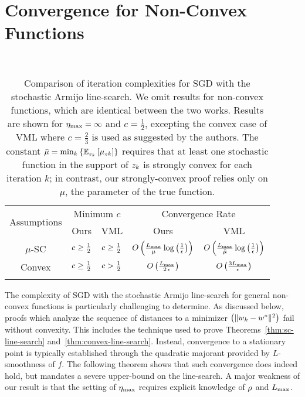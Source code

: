 \section{Convergence for Non-Convex Functions}~\label{sec:ls-nc}

\begin{table}[t]
    \centering
    \begin{tabular}{c l l c c }\toprule
        \multirow{2}{*}{Assumptions} & \multicolumn{2}{c}{Minimum \( c \)} & \multicolumn{2}{c}{Convergence Rate}\\%
        \cmidrule(lr){2-3} \cmidrule(lr){4-5}
                 & \multicolumn{1}{c}{Ours} & \multicolumn{1}{c}{VML}%
                 & \multicolumn{1}{c}{Ours} & \multicolumn{1}{c}{VML}\\ \midrule
    \( \mu \)-SC & \( c \geq \frac 1 2 \)%
                 & \( c \geq \frac 1 2 \)%
                 & \( O\left(\frac{L_{\text{max}}}{\mu} \log\left(\frac{1}{\epsilon}\right)\right) \)%
                 & \( O\left(\frac{L_{\text{max}}}{\bar \mu} \log\left(\frac{1}{\epsilon}\right)\right) \) \\ \addlinespace
    Convex       & \( c \geq \frac 1 2 \)%
                 & \( c > \frac 1 2 \)%
                 & \( O\left(\frac{L_{\text{max}}}{2 \, \epsilon}\right) \)%
                 & \( O\left(\frac{3 L_{\text{max}}}{\epsilon}\right) \)\\ \addlinespace 
        \end{tabular}
        \caption{Comparison of iteration complexities for \ac{SGD} with the stochastic Armijo line-search.  We omit results for non-convex functions, which are identical between the two works. Results are shown for \( \eta_{\text{max}} = \infty \) and \( c = \frac{1}{2} \), excepting the convex case of VML \citep{vaswani2019painless} where \( c = \frac{2}{3} \) is used as suggested by the authors. The constant \( \bar \mu = \min_k \left\{\mathbb{E}_{z_{k}} \left[\mu_{zk}\right] \right\} \) requires that at least one stochastic function in the support of \( z_{k} \) is strongly convex for each iteration \( k \); in contrast, our strongly-convex proof relies only on \( \mu \), the parameter of the true function.  }%
    \label{table:ls-comparison}
\end{table}

The complexity of \ac{SGD} with the stochastic Armijo line-search for general non-convex functions is particularly challenging to determine.
As discussed below, proofs which analyze the sequence of distances to a minimizer \( \left(\|w_k - w^*\|^2\right) \) fail without convexity.
This includes the technique used to prove Theorems~\ref{thm:sc-line-search} and~\ref{thm:convex-line-search}.
Instead, convergence to a stationary point is typically established through the quadratic majorant provided by \( L \)-smoothness of \( f \).
The following theorem shows that such convergence does indeed hold, but mandates a severe upper-bound on the line-search.
A major weakness of our result is that the setting of \( \eta_{\text{max}} \) requires explicit knowledge of \( \rho \) and \( L_{\text{max}} \). 

